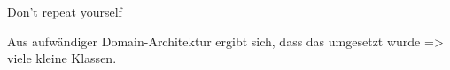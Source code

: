 
Don't repeat yourself

Aus aufwändiger Domain-Architektur ergibt sich, dass das umgesetzt wurde => viele kleine Klassen.



